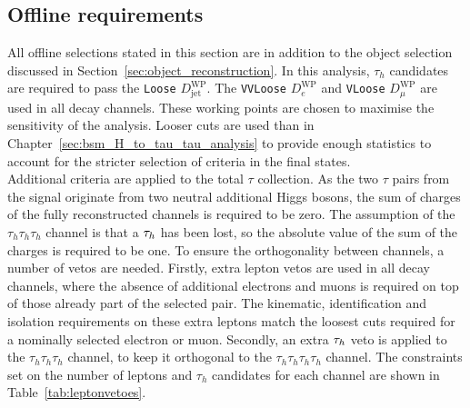 \subsection{Offline requirements}

All offline selections stated in this section are in addition to the object selection discussed in Section~\ref{sec:object_reconstruction}.
In this analysis, $\tau_h$ candidates are required to pass the \texttt{Loose} $D_{\text{jet}}^{\text{WP}}$.
The \texttt{VVLoose} $D_{e}^{\text{WP}}$ and \texttt{VLoose} $D_{\mu}^{\text{WP}}$ are used in all decay channels.
These working points are chosen to maximise the sensitivity of the analysis. 
Looser cuts are used than in Chapter~\ref{sec:bsm_H_to_tau_tau_analysis} to provide enough statistics to account for the stricter selection of criteria in the final states. \\

Additional criteria are applied to the total $\tau$ collection.
As the two $\tau$ pairs from the signal originate from two neutral additional Higgs bosons, the sum of charges of the fully reconstructed channels is required to be zero. 
The assumption of the $\tau_h \tau_h \tau_h$ channel is that a $\tau_{h}$ has been lost, so the absolute value of the sum of the charges is required to be one.
To ensure the orthogonality between channels, a number of vetos are needed. 
Firstly, extra lepton vetos are used in all decay channels, where the absence of additional electrons and muons is required on top of those already part of the selected pair.
The kinematic, identification and isolation requirements on these extra leptons match the loosest cuts required for a nominally selected electron or muon.
Secondly, an extra $\tau_{h}$ veto is applied to the $\tau_h \tau_h \tau_h$ channel, to keep it orthogonal to the $\tau_h \tau_h \tau_h \tau_h$ channel.
The constraints set on the number of leptons and $\tau_h$ candidates for each channel are shown in Table~\ref{tab:leptonvetoes}. \\

